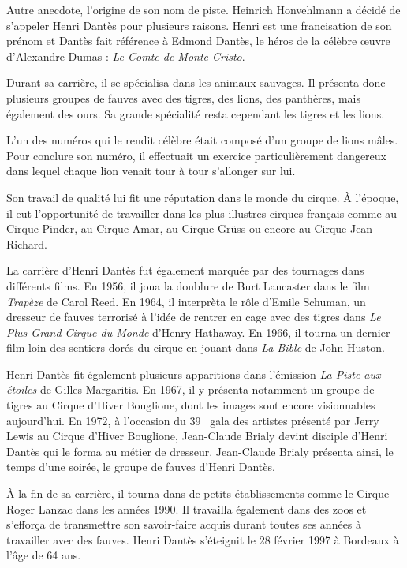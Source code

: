 Autre anecdote, l’origine de son nom de piste. Heinrich Honvehlmann a décidé de s’appeler Henri Dantès pour plusieurs raisons. Henri est une francisation de son prénom et Dantès fait référence à Edmond Dantès, le héros de la célèbre œuvre d'Alexandre Dumas : \textit{Le Comte de Monte-Cristo}.

Durant sa carrière, il se spécialisa dans les animaux sauvages. Il présenta donc plusieurs groupes de fauves avec des tigres, des lions, des panthères, mais également des ours. Sa grande spécialité resta cependant les tigres et les lions.

L’un des numéros qui le rendit célèbre était composé d’un groupe de lions mâles. Pour conclure son numéro, il effectuait un exercice particulièrement dangereux dans lequel chaque lion venait tour à tour s’allonger sur lui.

Son travail de qualité lui fit une réputation dans le monde du cirque. À l'époque, il eut l'opportunité de travailler dans les plus illustres cirques français comme au Cirque Pinder, au Cirque Amar, au Cirque Grüss ou encore au Cirque Jean Richard.

La carrière d’Henri Dantès fut également marquée par des tournages dans différents films. En 1956, il joua la doublure de Burt Lancaster dans le film \textit{Trapèze} de Carol Reed. En 1964, il interprèta le rôle d’Emile Schuman, un dresseur de fauves terrorisé à l’idée de rentrer en cage avec des tigres dans \textit{Le Plus Grand Cirque du Monde} d'Henry Hathaway. En 1966, il tourna un dernier film loin des sentiers dorés du cirque en jouant dans \textit{La Bible} de John Huston.

Henri Dantès fit également plusieurs apparitions dans l’émission \textit{La Piste aux étoiles} de Gilles Margaritis. En 1967, il y présenta notamment un groupe de tigres au Cirque d’Hiver Bouglione, dont les images sont encore visionnables aujourd’hui. En 1972, à l’occasion du 39\ieme~ gala des artistes présenté par Jerry Lewis au Cirque d’Hiver Bouglione, Jean-Claude Brialy devint disciple d'Henri Dantès qui le forma au métier de dresseur. Jean-Claude Brialy présenta ainsi, le temps d'une soirée, le groupe de fauves d’Henri Dantès.

À la fin de sa carrière, il tourna dans de petits établissements comme le Cirque Roger Lanzac dans les années 1990. Il travailla également dans des zoos et s’efforça de transmettre son savoir-faire acquis durant toutes ses années à travailler avec des fauves. Henri Dantès s’éteignit le 28 février 1997 à Bordeaux à l’âge de 64 ans.

